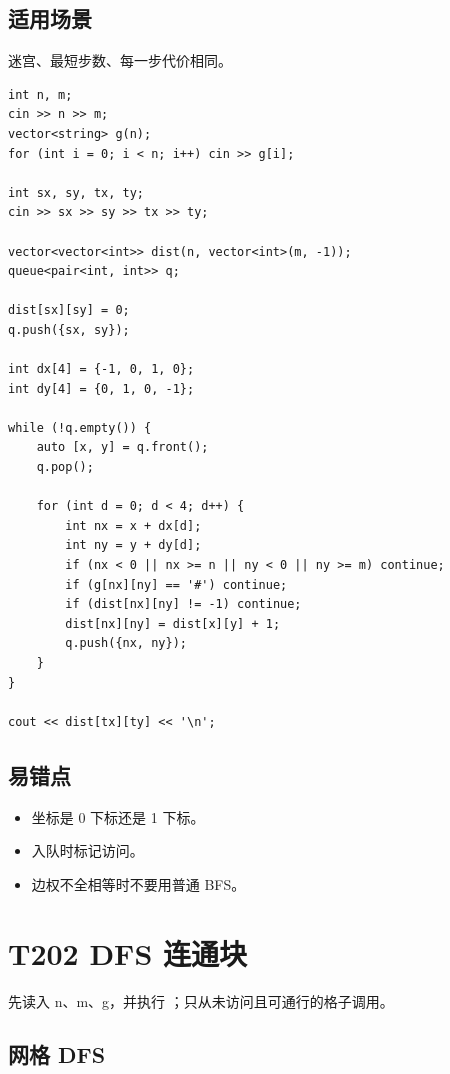 \subsection{适用场景}

迷宫、最短步数、每一步代价相同。

\begin{lstlisting}
int n, m;
cin >> n >> m;
vector<string> g(n);
for (int i = 0; i < n; i++) cin >> g[i];

int sx, sy, tx, ty;
cin >> sx >> sy >> tx >> ty;

vector<vector<int>> dist(n, vector<int>(m, -1));
queue<pair<int, int>> q;

dist[sx][sy] = 0;
q.push({sx, sy});

int dx[4] = {-1, 0, 1, 0};
int dy[4] = {0, 1, 0, -1};

while (!q.empty()) {
    auto [x, y] = q.front();
    q.pop();

    for (int d = 0; d < 4; d++) {
        int nx = x + dx[d];
        int ny = y + dy[d];
        if (nx < 0 || nx >= n || ny < 0 || ny >= m) continue;
        if (g[nx][ny] == '#') continue;
        if (dist[nx][ny] != -1) continue;
        dist[nx][ny] = dist[x][y] + 1;
        q.push({nx, ny});
    }
}

cout << dist[tx][ty] << '\n';
\end{lstlisting}

\subsection{易错点}

\begin{itemize}
  \item 坐标是 0 下标还是 1 下标。
  \item 入队时标记访问。
  \item 边权不全相等时不要用普通 BFS。
\end{itemize}

\section{T202 DFS 连通块}\label{sec:09-16}\label{tpl:202}

先读入 n、m、g，并执行 ；只从未访问且可通行的格子调用。

\subsection{网格 DFS}

